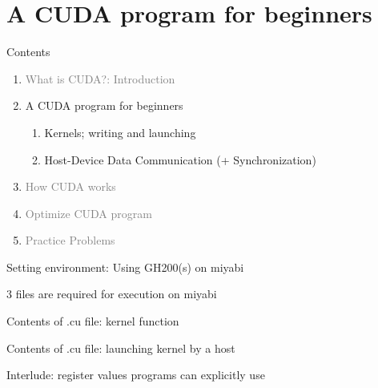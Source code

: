 \documentclass[dvipdfmx,11pt]{beamer}   %
\begin{document}
\section{A CUDA program for beginners}
\begin{frame}{Contents}
  \begin{enumerate}[<+->]   %
    \item \textcolor{gray}{What is CUDA?: Introduction}
    \item A CUDA program for beginners
    \begin{enumerate}
      \item Kernels; writing and launching
      \item Host-Device Data Communication (+ Synchronization)
    \end{enumerate}
    \item \textcolor{gray}{How CUDA works}
    \item \textcolor{gray}{Optimize CUDA program}
    \item \textcolor{gray}{Practice Problems}
  \end{enumerate}
\end{frame}
\begin{frame}{Setting environment: Using GH200(s) on miyabi}

\end{frame}
\begin{frame}{3 files are required for execution on miyabi}

\end{frame}
\begin{frame}{Contents of .cu file: kernel function}
  
\end{frame}
\begin{frame}{Contents of .cu file: launching kernel by a host}

\end{frame}
\begin{frame}{Interlude: register values programs can explicitly use}

\end{frame}
\end{document}

